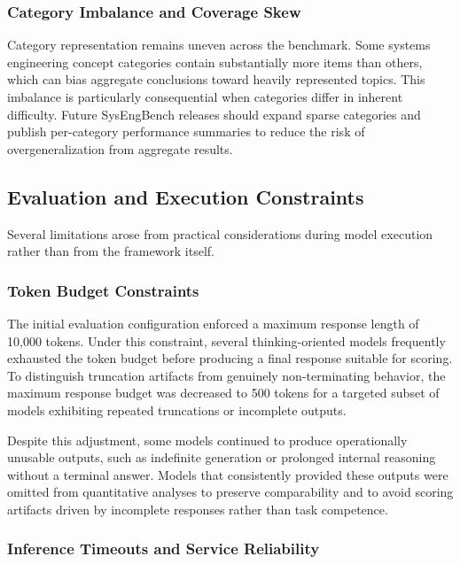 \subsubsection{Category Imbalance and Coverage Skew}

Category representation remains uneven across the benchmark. Some systems engineering concept categories contain substantially more items than others, which can bias aggregate conclusions toward heavily represented topics. This imbalance is particularly consequential when categories differ in inherent difficulty. Future SysEngBench releases should expand sparse categories and publish per-category performance summaries to reduce the risk of overgeneralization from aggregate results.

\subsection{Evaluation and Execution Constraints}

Several limitations arose from practical considerations during model execution rather than from the framework itself.

\subsubsection{Token Budget Constraints}

The initial evaluation configuration enforced a maximum response length of 10,000 tokens. Under this constraint, several thinking-oriented models frequently exhausted the token budget before producing a final response suitable for scoring. To distinguish truncation artifacts from genuinely non-terminating behavior, the maximum response budget was decreased to 500 tokens for a targeted subset of models exhibiting repeated truncations or incomplete outputs.

Despite this adjustment, some models continued to produce operationally unusable outputs, such as indefinite generation or prolonged internal reasoning without a terminal answer. Models that consistently provided these outputs were omitted from quantitative analyses to preserve comparability and to avoid scoring artifacts driven by incomplete responses rather than task competence.

\subsubsection{Inference Timeouts and Service Reliability}

